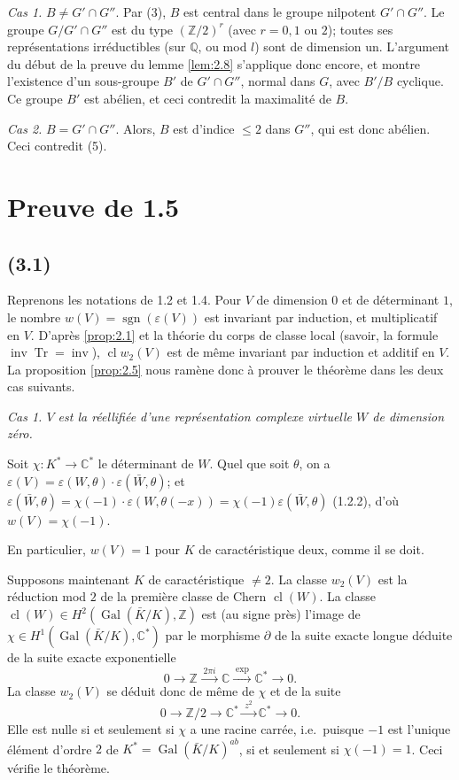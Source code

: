 \documentclass[11pt]{amsart}
\theoremstyle{plain}
\theoremstyle{definition}
\DeclareMathOperator{\Gal}{Gal}
\DeclareMathOperator{\Tr}{Tr}
\DeclareMathOperator{\inv}{inv}
\DeclareMathOperator{\sgn}{sgn}
\DeclareMathOperator{\cl}{cl}
\newcommand{\C}{\mathbb{C}}
\newcommand{\Z}{\mathbb{Z}}
\newcommand{\Q}{\mathbb{Q}}
\begin{document}
\textit{Cas 1.} $B\neq G'\cap G''$. Par (3), $B$ est central dans le groupe nilpotent $G'\cap G''$. Le groupe $G/G'\cap G''$ est du type $(\Z/2)^r$ (avec $r=0,1$ ou $2$); toutes ses repr\'esentations irr\'eductibles (sur $\Q$, ou mod $l$) sont de dimension un. L'argument du d\'ebut de la preuve du lemme \ref{lem:2.8} s'applique donc encore, et montre l'existence d'un sous-groupe $B'$ de $G'\cap G''$, normal dans $G$, avec $B'/B$ cyclique. Ce groupe $B'$ est ab\'elien, et ceci contredit la maximalit\'e de $B$.

\textit{Cas 2.} $B=G'\cap G''$. Alors, $B$ est d'indice $\le2$ dans $G''$, qui est donc ab\'elien. Ceci contredit (5).

\section{Preuve de 1.5}

\subsection{(3.1)}
Reprenons les notations de 1.2 et 1.4. Pour $V$ de dimension $0$ et de d\'eterminant $1$, le nombre $w(V)=\sgn(\varepsilon(V))$ est invariant par induction, et multiplicatif en $V$. D'apr\`es \ref{prop:2.1} et la th\'eorie du corps de classe local (savoir, la formule $\inv\Tr=\inv$), $\cl w_2(V)$ est de m\^eme invariant par induction et additif en $V$. La proposition \ref{prop:2.5} nous ram\`ene donc \`a prouver le th\'eor\`eme dans les deux cas suivants.

\textit{Cas 1. $V$ est la r\'eellifi\'ee d'une repr\'esentation complexe virtuelle $W$ de dimension z\'ero.}

Soit $\chi\colon K^*\to\C^*$ le d\'eterminant de $W$. Quel que soit $\theta$, on a $\varepsilon(V)=\varepsilon(W,\theta)\cdot\varepsilon(\bar{W},\theta)$; et $\varepsilon(\bar{W},\theta)=\chi(-1)\cdot\varepsilon(W,\theta(-x))=\chi(-1)\varepsilon(\bar{W},\theta)$ (1.2.2), d'o\`u $w(V)=\chi(-1)$.

En particulier, $w(V)=1$ pour $K$ de caract\'eristique deux, comme il se doit.

Supposons maintenant $K$ de caract\'eristique $\neq2$. La classe $w_2(V)$ est la r\'eduction mod $2$ de la premi\`ere classe de Chern $\cl(W)$. La classe $\cl(W)\in H^2(\Gal(\bar K/K),\Z)$ est (au signe pr\`es) l'image de $\chi\in H^1(\Gal(\bar K/K),\C^*)$ par le morphisme $\partial$ de la suite exacte longue d\'eduite de la suite exacte exponentielle
\[
0\longrightarrow\Z\xrightarrow{\;2\pi i\;}\C\xrightarrow{\;\exp\;}\C^*\longrightarrow 0.
\]
La classe $w_2(V)$ se d\'eduit donc de m\^eme de $\chi$ et de la suite
\[
0\longrightarrow\Z/2\longrightarrow\C^*\xrightarrow{\;z^2\;}\C^*\longrightarrow 0.
\]
Elle est nulle si et seulement si $\chi$ a une racine carr\'ee, i.e.~puisque $-1$ est l'unique \'el\'ement d'ordre $2$ de $K^*=\Gal(\bar K/K)^{ab}$, si et seulement si $\chi(-1)=1$. Ceci v\'erifie le th\'eor\`eme.
\end{document}
